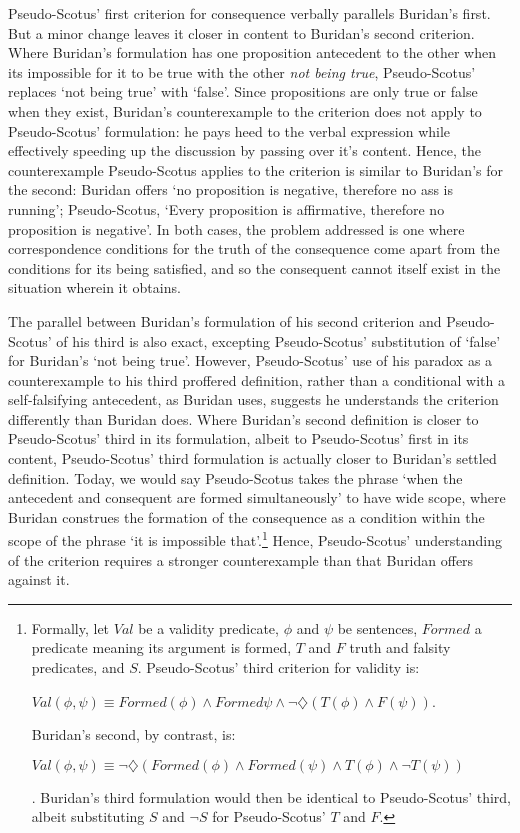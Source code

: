 \documentclass[]{article}
\begin{document}
Pseudo-Scotus' first criterion for consequence verbally parallels Buridan's first. But a minor change leaves it closer in content to Buridan's second criterion. Where Buridan's formulation has one proposition antecedent to the other when its impossible for it to be true with the other \textit{not being true}, Pseudo-Scotus' replaces `not being true' with `false'. Since propositions are only true or false when they exist, Buridan's counterexample to the criterion does not apply to Pseudo-Scotus' formulation: he pays heed to the verbal expression while effectively speeding up the discussion by passing over it's content. Hence, the counterexample Pseudo-Scotus applies to the criterion is similar to Buridan's for the second: Buridan offers `no proposition is negative, therefore no ass is running'; Pseudo-Scotus, `Every proposition is affirmative, therefore no proposition is negative'. In both cases, the problem addressed is one where correspondence conditions for the truth of the consequence come apart from the conditions for its being satisfied, and so the consequent cannot itself exist in the situation wherein it obtains. 

The parallel between Buridan's formulation of his second criterion and Pseudo-Scotus' of his third is also exact, excepting Pseudo-Scotus' substitution of `false' for Buridan's `not being true'. However, Pseudo-Scotus' use of his paradox as a counterexample to his third proffered definition, rather than a conditional with a self-falsifying antecedent, as Buridan uses, suggests he understands the criterion differently than Buridan does. Where Buridan's second definition is closer to Pseudo-Scotus' third in its formulation, albeit to Pseudo-Scotus' first in its content, Pseudo-Scotus' third formulation is actually closer to Buridan's settled definition. Today, we would say Pseudo-Scotus takes the phrase `when the antecedent and consequent are formed simultaneously' to have wide scope, where Buridan construes the formation of the consequence as a condition within the scope of the phrase `it is impossible that'.\footnote{Formally, let $Val$ be a validity predicate, $\phi$ and $ \psi$ be sentences, $Formed$ a predicate meaning its argument is formed, $T$ and $F$ truth and falsity predicates, and $S$. Pseudo-Scotus' third criterion for validity is: 
\begin{center}
$Val(\phi, \psi) \equiv Formed(\phi) \wedge  Formed\psi \wedge \neg \diamondsuit(T(\phi) \wedge F(\psi))$.
\end{center}
Buridan's second, by contrast, is:
\begin{center}
$Val(\phi, \psi) \equiv \neg \diamondsuit(Formed(\phi) \wedge Formed(\psi) \wedge T(\phi) \wedge \neg T(\psi))$
\end{center}. Buridan's third formulation would then be identical to Pseudo-Scotus' third, albeit substituting $S$ and $\neg S$ for Pseudo-Scotus' $T$ and $F$.} Hence, Pseudo-Scotus' understanding of the criterion requires a stronger counterexample than that Buridan offers against it.
\end{document}
